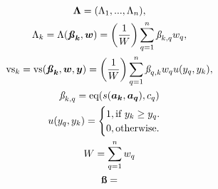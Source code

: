 \documentclass{article}
\begin{document}
\begin{gather}
    \boldsymbol{\Lambda} = (\Lambda_{1}, ..., \Lambda_{n}),\\
    \Lambda_k = 
    \Lambda(\boldsymbol{\textbf{\textit{\ss}}_{k}}, \boldsymbol{w}) = 
        \left(
            \frac{1}{W}
        \right)
        \sum_{q=1}^{n}{
            \textit{\ss}_{k,q}
            w_q
        },\\
    \text{vs}_k = 
    \text{vs}(\boldsymbol{\textbf{\textit{\ss}}_{k}}, \boldsymbol{w}, \boldsymbol{y}) = 
    \left(
        \frac{1}{W}
    \right)
        \sum_{q=1}^{n}{
            \textit{\ss}_{q,k}
            w_q
            u(y_q,y_k)
        }
        ,\\
    \textit{\ss}_{k,q} = 
        \text{eq}(s(\boldsymbol{a_k},\boldsymbol{a_q}), c_q)\\
    u(y_q,y_k) =
    \begin{cases}
        1, \text{if } y_k \geq y_q.\\
        0, \text{otherwise.}
    \end{cases}\\
    W = 
        \sum_{q=1}^{n}{
            w_q
        }\\
    \textbf{\ss} = 

\end{gather}
\end{document}
